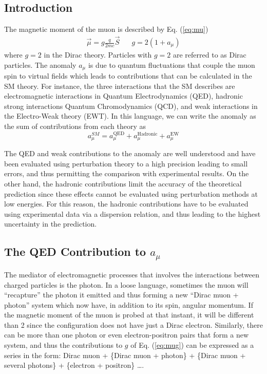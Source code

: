 \documentclass{outhesis}
\begin{document}
\subsection{Introduction}
The magnetic moment of the muon is described by Eq. (\ref{eq:mu})
\begin{equation}
\begin{split}
\overrightarrow{\mu} = g\frac{q}{2mc}\overrightarrow{S} \,\,\,\,\,\,\,\,\,\,  g = 2\left(1+a_{\mu}\right)
\label{eq:mug}
\end{split}
\end{equation}
where $g=2$ in the Dirac theory. Particles with $g=2$ are referred to as Dirac particles. The anomaly $a_{\mu}$ is due to quantum fluctuations that couple the muon spin to virtual fields which leads to contributions that can be calculated in the SM theory. For instance, the three interactions that the SM describes are electromagnetic interactions in Quantum Electrodynamics (QED), hadronic strong interactions Quantum Chromodynamics (QCD), and weak interactions in the Electro-Weak theory (EWT). In this language, we can write the anomaly as the sum of contributions from each theory as
\begin{equation}
a_{\mu}^{SM} = a_{\mu}^{\text{QED}}+a_{\mu}^{\text{Hadronic}}+a_{\mu}^{\text{EW}}
\label{eq:asm}
\end{equation}

The QED and weak contributions to the anomaly are well understood and have been evaluated using perturbation theory to a high precision leading to small errors, and thus permitting the comparison with experimental results. On the other hand, the hadronic contributions limit the accuracy of the theoretical prediction since these effects cannot be evaluated using perturbation methods at low energies. For this reason, the hadronic contributions have to be evaluated using experimental data via a dispersion relation, and thus leading to the highest uncertainty in the prediction.

\subsection{The QED Contribution to $a_{\mu}$}

The mediator of electromagnetic processes that involves the interactions between charged particles is the photon. In a loose language, sometimes the muon will ``recapture'' the photon it emitted and thus forming a new ``Dirac muon + photon'' system which now have, in addition to its spin, angular momentum. %
If the magnetic moment of the muon is probed at that instant, it will be different than 2 since the configuration does not have just a Dirac electron. Similarly, there can be more than one photon or even electron-positron pairs that form a new system, and thus the contributions to $g$ of Eq. (\ref{eq:mug}) can be expressed as a series in the form: Dirac muon + \{Dirac muon + photon\} + \{Dirac muon + several photons\} + \{electron + positron\} \ldots.
\end{document}
